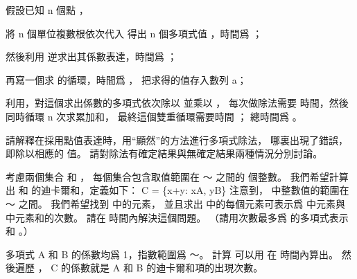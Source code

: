 \startANSWER
假設已知 n 個點 ，
\startigBase[n]
\item 將 n 個單位複數根依次代入  得出 n 個多項式值 ，時間爲 ；
\item 然後利用  逆求出其係數表達，時間爲 ；
\item 再寫一個求  的循環，時間爲 ，
把求得的值存入數列 a；
\item 利用，對這個求出係數的多項式依次除以  並乘以 ，
每次做除法需要  時間，然後同時循環 n 次求累加和，
最終這個雙重循環需要時間 ；
\stopigBase
總時間爲 。
\stopANSWER

\startEXERCISE
請解釋在採用點值表達時，用“顯然”的方法進行多項式除法，
哪裏出現了錯誤，即除以相應的  值。
請對除法有確定結果與無確定結果兩種情況分別討論。
\stopEXERCISE

\startANSWER
{}
\stopANSWER

\startEXERCISE
考慮兩個集合  和 ，
每個集合包含取值範圍在 ～ 之間的  個整數。
我們希望計算出  和  的{\EMP 迪卡爾和}，定義如下：
\startformula
C = \{x+y: x\in A, y\in B\}
\stopformula
注意到，  中整數值的範圍在 ～ 之間。
我們希望找到  中的元素，
並且求出  中的每個元素可表示爲  中元素與  中元素和的次數。
請在  時間內解決這個問題。
（\hint 請用次數最多爲  的多項式表示  和 。）
\stopEXERCISE

\startANSWER
多項式 A 和 B 的係數均爲 1，指數範圍爲 ～。
計算  可以用  在  時間內算出。
然後遍歷 ， C 的係數就是 A 和 B 的迪卡爾和項的出現次數。
\stopANSWER

\stopsection
